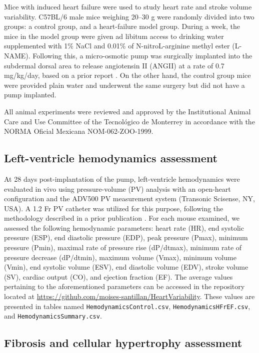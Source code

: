 \documentclass[%
preprint,
 amsmath,amssymb,
 aps,
]{revtex4-2}
\begin{document}
Mice with induced heart failure were used to study heart rate and stroke volume variability. C57BL/6 male mice weighing 20–30 g were randomly divided into two groups: a control group, and a heart-failure model group. During a week, the mice in the model group were given ad libitum access to drinking water supplemented with 1\% NaCl and 0.01\% of N-nitroL-arginine methyl ester (L-NAME). Following this, a micro-osmotic pump was surgically implanted into the subdermal dorsal area to release angiotensin II (ANGII) at a rate of 0.7 mg/kg/day, based on a prior report \citep{Ruiz_Esparza_2016}. On the other hand, the control group mice were provided plain water and underwent the same surgery but  did not have a pump implanted.

All animal experiments were reviewed and approved by the Institutional Animal Care and Use Committee of the Tecnológico de Monterrey in accordance with the NORMA Oficial Mexicana NOM-062-ZOO-1999. 

\subsection{Left-ventricle hemodynamics assessment}

At 28 days post-implantation of the pump, left-ventricle hemodynamics were evaluated in vivo using pressure-volume (PV) analysis with an open-heart configuration and the ADV500 PV measurement system (Transonic Scisense, NY, USA). A 1.2 Fr PV catheter was utilized for this purpose, following the methodology described in a prior publication \citep{Pacher_2008}. For each mouse examined, we assessed the following hemodynamic parameters: heart rate (HR), end systolic pressure (ESP), end diastolic pressure (EDP), peak pressure (Pmax), minimum pressure (Pmin), maximal rate of pressure rise (dP/dtmax), minimum rate of pressure decrease (dP/dtmin), maximum volume (Vmax), minimum volume (Vmin), end systolic volume (ESV), end diastolic volume (EDV), stroke volume (SV), cardiac output (CO), and ejection fraction (EF). The average values pertaining to the aforementioned parameters can be accessed in the repository located at \url{https://github.com/moises-santillan/HeartVariability}. These values are presented in tables named \texttt{HemodynamicsControl.csv}, \texttt{HemodynamicsHFrEF.csv}, and \texttt{HemodynamicsSummary.csv}.

\subsection{Fibrosis and cellular hypertrophy assessment}
\end{document}
